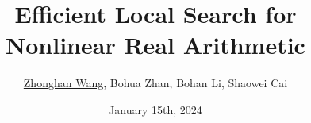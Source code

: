 \author{\underline{Zhonghan Wang}, Bohua Zhan, Bohan Li, Shaowei Cai}
\title{Efficient Local Search for Nonlinear Real Arithmetic}
\date{January 15th, 2024}

